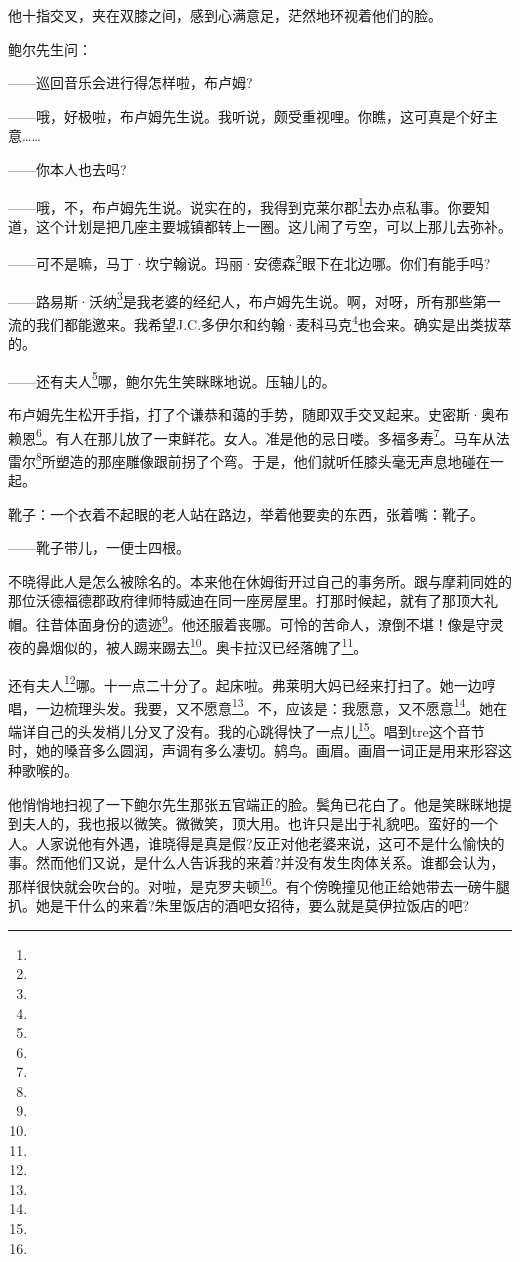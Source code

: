 \par 他十指交叉，夹在双膝之间，感到心满意足，茫然地环视着他们的脸。
\par 鲍尔先生问：
\par ——巡回音乐会进行得怎样啦，布卢姆?
\par ——哦，好极啦，布卢姆先生说。我听说，颇受重视哩。你瞧，这可真是个好主意……
\par ——你本人也去吗?
\par ——哦，不，布卢姆先生说。说实在的，我得到克莱尔郡\footnote{}去办点私事。你要知道，这个计划是把几座主要城镇都转上一圈。这儿闹了亏空，可以上那儿去弥补。
\par ——可不是嘛，马丁·坎宁翰说。玛丽·安德森\footnote{}眼下在北边哪。你们有能手吗?
\par ——路易斯·沃纳\footnote{}是我老婆的经纪人，布卢姆先生说。啊，对呀，所有那些第一流的我们都能邀来。我希望J.C.多伊尔和约翰·麦科马克\footnote{}也会来。确实是出类拔萃的。
\par ——还有夫人\footnote{}哪，鲍尔先生笑眯眯地说。压轴儿的。
\par 布卢姆先生松开手指，打了个谦恭和蔼的手势，随即双手交叉起来。史密斯·奥布赖恩\footnote{}。有人在那儿放了一束鲜花。女人。准是他的忌日喽。多福多寿\footnote{}。马车从法雷尔\footnote{}所塑造的那座雕像跟前拐了个弯。于是，他们就听任膝头毫无声息地碰在一起。
\par 靴子：一个衣着不起眼的老人站在路边，举着他要卖的东西，张着嘴：靴子。
\par ——靴子带儿，一便士四根。
\par 不晓得此人是怎么被除名的。本来他在休姆街开过自己的事务所。跟与摩莉同姓的那位沃德福德郡政府律师特威迪在同一座房屋里。打那时候起，就有了那顶大礼帽。往昔体面身份的遗迹\footnote{}。他还服着丧哪。可怜的苦命人，潦倒不堪！像是守灵夜的鼻烟似的，被人踢来踢去\footnote{}。奥卡拉汉已经落魄了\footnote{}。
\par 还有夫人\footnote{}哪。十一点二十分了。起床啦。弗莱明大妈已经来打扫了。她一边哼唱，一边梳理头发。我要，又不愿意\footnote{}。不，应该是：我愿意，又不愿意\footnote{}。她在端详自己的头发梢儿分叉了没有。我的心跳得快了一点儿\footnote{}。唱到tre这个音节时，她的嗓音多么圆润，声调有多么凄切。鸫鸟。画眉。画眉一词正是用来形容这种歌喉的。
\par 他悄悄地扫视了一下鲍尔先生那张五官端正的脸。鬓角已花白了。他是笑眯眯地提到夫人的，我也报以微笑。微微笑，顶大用。也许只是出于礼貌吧。蛮好的一个人。人家说他有外遇，谁晓得是真是假?反正对他老婆来说，这可不是什么愉快的事。然而他们又说，是什么人告诉我的来着?并没有发生肉体关系。谁都会认为，那样很快就会吹台的。对啦，是克罗夫顿\footnote{}。有个傍晚撞见他正给她带去一磅牛腿扒。她是干什么的来着?朱里饭店的酒吧女招待，要么就是莫伊拉饭店的吧?
